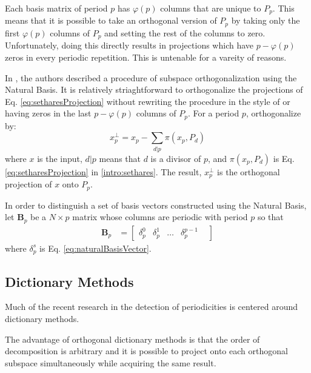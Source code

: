     Each basis matrix of period $p$ has $\varphi(p)$ columns that are unique to $P_p$. This means that it is possible to take an orthogonal version of $P_p$ by taking only the first $\varphi(p)$ columns of $P_p$ and setting the rest of the columns to zero. Unfortunately, doing this directly results in projections which have $p - \varphi(p)$ zeros in every periodic repetition. This is untenable for a vareity of reasons.

    In \cite{muresan2003orthogonal}, the authors described a procedure of subspace orthogonalization using the Natural Basis. It is relatively striaghtforward to orthogonalize the projections of Eq. \ref{eq:setharesProjection} without rewriting the procedure in the style of \cite{muresan2003orthogonal} or having zeros in the last $p - \varphi(p)$ columns of $P_p$. For a period $p$, orthogonalize by:
    \begin{equation}
        x^{\perp}_{p} = x_p - \sum_{d|p} \pi(x_p, P_d)
    \end{equation}
    where $x$ is the input, $d|p$ means that $d$ is a divisor of $p$, and $\pi(x_p, P_d)$ is Eq. \ref{eq:setharesProjection} in \ref{intro:sethares}. The result, $x^{\perp}_{p}$ is the orthogonal projection of $x$ onto $P_p$.

    In order to distinguish a set of basis vectors constructed using the Natural Basis, let $\bm{B}_p$ be a $N \times p$ matrix whose columns are periodic with period $p$ so that
    \begin{align}
        \bm{B}_p &= \begin{bmatrix}
                \delta^0_p &
                \delta^1_p &
                \hdots &
                \delta^{p-1}_p &
            \end{bmatrix}
    \end{align}
    where $\delta^s_p$ is Eq. \ref{eq:naturalBasisVector}.


    \subsection{Dictionary Methods}
    Much of the recent research in the detection of periodicities is centered around dictionary methods.

    The advantage of orthogonal dictionary methods is that the order of decomposition is arbitrary and it is possible to project onto each orthogonal subspace simultaneously while acquiring the same result.

